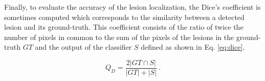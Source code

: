 Finally, to evaluate the accuracy of the lesion localization, the Dice's coefficient is sometimes computed which corresponds to the similarity between a detected lesion and its ground-truth. This coefficient consists of the ratio of twice the number of pixels in common to the sum of the pixels of the lesions in the ground-truth $GT$ and the output of the classifier $S$ defined as shown in Eq. \eqref{eq:dice}.

\begin{equation}
	Q_D = \frac{2 | GT \cap S |}{| GT | + | S |} \ .
	\label{eq:dice}
\end{equation}